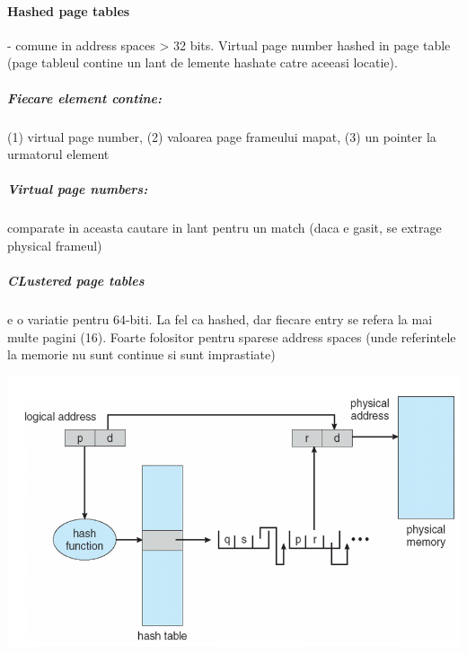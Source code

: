 \documentclass{article}
\begin{document}
\paragraph*{Hashed page tables} - comune in address spaces > 32 bits. Virtual page number hashed in page table (page tableul contine un lant de lemente hashate catre aceeasi locatie).
\subparagraph*{Fiecare element contine:} (1) virtual page number, (2) valoarea page frameului mapat, (3) un pointer la urmatorul element
\subparagraph*{Virtual page numbers:} comparate in aceasta cautare in lant pentru un match (daca e gasit, se extrage physical frameul)
\subparagraph*{CLustered page tables} e o variatie pentru 64-biti. La fel ca hashed, dar fiecare entry se refera la mai multe pagini (16). Foarte folositor pentru sparese address spaces (unde referintele la memorie nu sunt continue si sunt imprastiate)
\begin{center}
    \includegraphics[scale=0.3]{25-hpt.png}
\end{center}
\end{document}
